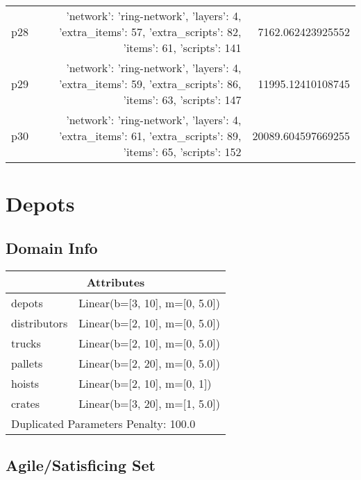 \documentclass{article}
\begin{document}
\begin{center}
\begin{tabular}{r|r|r}
  p28&{'network': 'ring-network', 'layers': 4, 'extra\_items': 57, 'extra\_scripts': 82, 'items': 61, 'scripts': 141}&7162.062423925552\\
  p29&{'network': 'ring-network', 'layers': 4, 'extra\_items': 59, 'extra\_scripts': 86, 'items': 63, 'scripts': 147}&11995.12410108745\\
  p30&{'network': 'ring-network', 'layers': 4, 'extra\_items': 61, 'extra\_scripts': 89, 'items': 65, 'scripts': 152}&20089.604597669255
                            \end{tabular}
                            \end{center}
                    
                            \newpage \section{Depots}
                    \subsection*{Domain Info}

                    \begin{center}
                    \begin{tabular}{p{}p{}}
                    \multicolumn{2}{c}{\bf \large Attributes}\\\midrule
                    depots & Linear(b=[3, 10], m=[0, 5.0])\\
distributors & Linear(b=[2, 10], m=[0, 5.0])\\
trucks & Linear(b=[2, 10], m=[0, 5.0])\\
pallets & Linear(b=[2, 20], m=[0, 5.0])\\
hoists & Linear(b=[2, 10], m=[0, 1])\\
crates & Linear(b=[3, 20], m=[1, 5.0])
                    
                     \\\midrule
                    \multicolumn{2}{l}{Duplicated Parameters Penalty: 100.0}
                    \end{tabular}
                    \end{center}
                
                         \subsection*{Agile/Satisficing Set}
\end{document}

